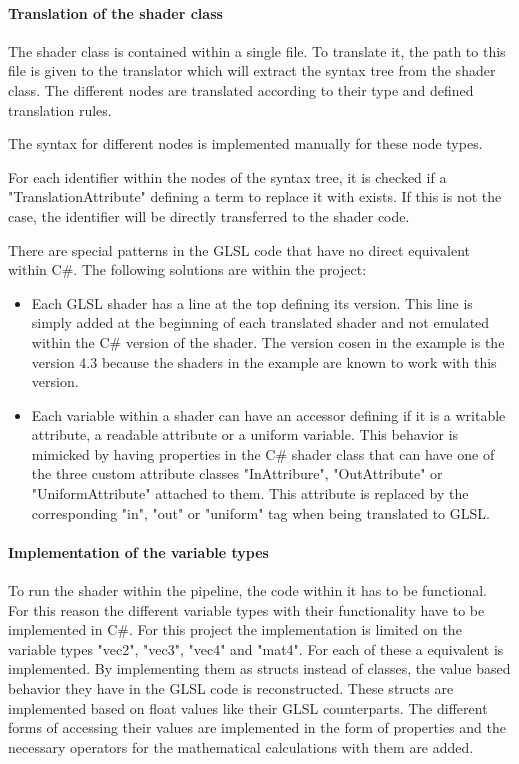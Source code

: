 \paragraph{Translation of the shader class}

The shader class is contained within a single file. To translate it, the path to this file is given to the translator which will extract the syntax tree from the shader class. The different nodes are translated according to their type and defined translation rules.

The syntax for different nodes is implemented manually for these node types.

For each identifier within the nodes of the syntax tree, it is checked if a "TranslationAttribute" defining a term to replace it with exists. If this is not the case, the identifier will be directly transferred to the shader code. 

There are special patterns in the GLSL code that have no direct equivalent within C\#. The following solutions are within the project:
\begin{itemize}
\item Each GLSL shader has a line at the top defining its version. This line is simply added at the beginning of each translated shader and not emulated within the C\# version of the shader. The version cosen in the example is the version 4.3 because the shaders in the example are known to work with this version.
\item Each variable within a shader can have an accessor defining if it is a writable attribute, a readable attribute or a uniform variable. This behavior is mimicked by having properties in the C\# shader class that can have one of the three custom attribute classes "InAttribure", "OutAttribute" or "UniformAttribute" attached to them. This attribute is replaced by the corresponding "in", "out" or "uniform" tag when being translated to GLSL.
\end{itemize}

\paragraph{Implementation of the variable types}
\label{paragraph:variableTypes}

To run the shader within the pipeline, the code within it has to be functional. For this reason the different variable types with their functionality have to be implemented in C\#. For this project the implementation is limited on the variable types "vec2", "vec3", "vec4" and "mat4". For each of these a equivalent is implemented. By implementing them as structs instead of classes, the value based behavior they have in the GLSL code is reconstructed. These structs are implemented based on float values like their GLSL counterparts. The different forms of accessing their values are implemented in the form of properties and the necessary operators for the mathematical calculations with them are added.


